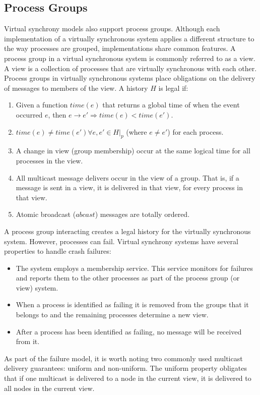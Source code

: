 \subsection{Process Groups}
Virtual synchrony models also support process groups. Although each implementation of a virtually synchronous system applies a different structure to the way processes are grouped, implementations share common features.
A process group in a virtual synchronous system is commonly referred to as a view. A view is a collection of processes that are virtually synchronous with each other. Process groups in virtually synchronous systems place obligations on the delivery of messages to members of the view. A history $H$ is legal if:
\begin{enumerate}
    \item Given a function $time(e)$ that returns a global time of when the event occurred $e$, then $e \rightarrow e' \Rightarrow time(e) < time(e').$
    \item $time(e) \neq time(e') \forall e, e' \in H|_{p}$ (where $e \neq e'$) for each process.
    \item A change in view (group membership) occur at the same logical time for all processes in the view.
    \item All multicast message delivers occur in the view of a group. That is, if a message is sent in a view, it is delivered in that view, for every process in that view.
    \item Atomic broadcast ($abcast$) messages are totally ordered.
\end{enumerate} \cite[p~.103]{ISISTOOLKIT}
A process group interacting creates a legal history for the virtually synchronous system. However, processes can fail.  Virtual synchrony systems have several properties to handle crash failures\cite[p~.102]{ISISTOOLKIT}:
\begin{itemize}
    \item The system employs a membership service. This service monitors for failures and reports them to the other processes as part of the process group (or view) system.
    \item When a process is identified as failing it is removed from the groups that it belongs to and the remaining processes determine a new view.
    \item After a process has been identified as failing, no message will be received from it.
\end{itemize} 
As part of the failure model, it is worth noting two commonly used multicast delivery guarantees: uniform and non-uniform. The uniform property obligates that if one multicast is delivered to a node in the current view, it is delivered to all nodes in the current view.
